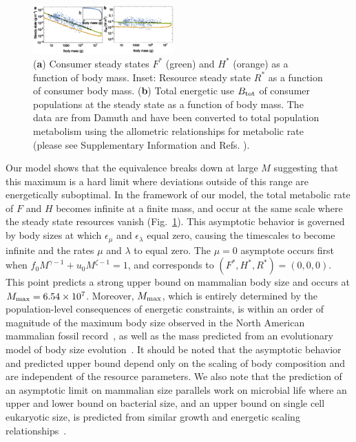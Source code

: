 \documentclass[twocolumn,preprintnumbers,amsmath,amssymb,superscriptaddress]{revtex4}
\begin{document}
\begin{bibunit}[unsrt]
\begin{figure}
\centering
\includegraphics[width=0.48\textwidth]{fig_FPAllometric2.eps}
\caption{\small{ ({\bf a}) Consumer steady states $F^*$ (green) and $H^*$ (orange) as a function of
  body mass. Inset: Resource steady state $R^*$ as a function of consumer body mass.
  ({\bf b}) Total energetic use $B_{\rm tot}$ of consumer populations at the steady state as a function of body mass.
  The data are from Damuth \citep{Damuth:1987kr} and have been converted to total population metabolism using the allometric relationships for metabolic rate (please see Supplementary Information and Refs. \citep{West:2001bv,hou,moses2008rmo}).}\label{fig:mass}}
\end{figure}

Our model shows that the equivalence breaks down at large $M$ suggesting that this maximum is a hard limit where deviations outside of this range are energetically suboptimal. %
In the framework of our model, the total metabolic rate of $F$ and $H$ becomes infinite at a finite mass, and occur at the same scale where the steady state resources vanish (Fig.~\ref{fig:mass}). This asymptotic behavior is governed by body sizes at which $\epsilon_{\mu}$ and $\epsilon_{\lambda}$ equal zero, causing the timescales to become infinite and the rates $\mu$ and $\lambda$ to equal zero.
The $\mu=0$ asymptote occurs first when $f_{0}M^{\gamma-1}+u_{0}M^{\zeta-1}=1$, and corresponds to $(F^*,H^*,R^*)=(0,0,0)$. This point predicts a strong upper bound on mammalian body size and occurs at $M_{\rm max}=6.54\times10^7$.
Moreover, $M_{\rm max}$, which is entirely determined by the population-level consequences of energetic constraints, is within an order of magnitude of the maximum body size observed in the North American mammalian fossil record~\citep{Alroy:1998p1594}, as well as the mass predicted from an evolutionary model of body size evolution~\citep{Clauset:2009fh}.
It should be noted that the asymptotic behavior and predicted upper bound depend only on the scaling of body composition and are independent of the resource parameters.
We also note that the prediction of an asymptotic limit on mammalian size parallels work on microbial life where an upper and lower bound on bacterial size, and an upper bound on single cell eukaryotic size, is predicted from similar growth and energetic scaling relationships~\citep{Kempes:2012hy,Kempes:2016}. %
\\


\end{bibunit}
\end{document}
